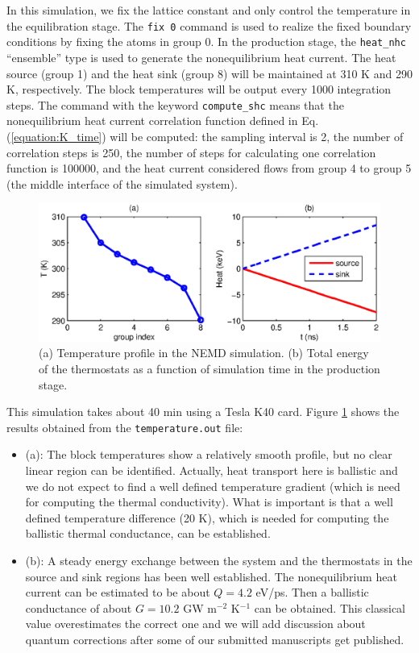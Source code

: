 \documentclass[12pt,a4paper]{report}
\begin{document}
In this simulation, we fix the lattice constant and only control the temperature in the equilibration stage. The \verb"fix 0" command is used to realize the fixed boundary conditions by fixing the atoms in group 0. In the production stage, the \verb"heat_nhc" ``ensemble'' type is used to generate the nonequilibrium heat current.  The heat source (group 1) and the heat sink (group 8) will be maintained at 310 K and 290 K, respectively. The block temperatures will be output every 1000 integration steps. The command with the keyword \verb"compute_shc" means that the nonequilibrium heat current correlation function defined in Eq. (\ref{equation:K_time}) will be computed: the sampling interval is 2, the number of correlation steps is 250, the number of steps for calculating one correlation function is 100000, and the heat current considered flows from group 4 to group 5 (the middle interface of the simulated system).


\begin{figure}[ht]
\begin{center}
\includegraphics[width=\columnwidth]{ex4a.eps}
\caption{(a) Temperature profile in the NEMD simulation. (b) Total energy of the thermostats as a function of simulation time in the production stage. }
\label{figure:ex4a}
\end{center}
\end{figure}

This simulation takes about 40 min using a Tesla K40 card. Figure \ref{figure:ex4a} shows the results obtained from the \verb"temperature.out" file:
\begin{itemize}
\item (a): The block temperatures show a relatively smooth profile, but no clear linear region can be identified. Actually, heat transport here is ballistic and we do not expect to find a well defined temperature gradient (which is need for computing the thermal conductivity). What is important is that a well defined temperature difference (20 K), which is needed for computing the ballistic thermal conductance, can be established.
\item (b): A steady energy exchange between the system and the thermostats in the source and sink regions has been well established. The nonequilibrium heat current can be estimated to be about $Q=4.2$ eV/ps. Then a ballistic conductance of about $G=10.2$ GW m$^{-2}$ K$^{-1}$ can be obtained. This classical value overestimates the correct one and we will add discussion about quantum corrections after some of our submitted manuscripts get published.
\end{itemize}
\end{document}
